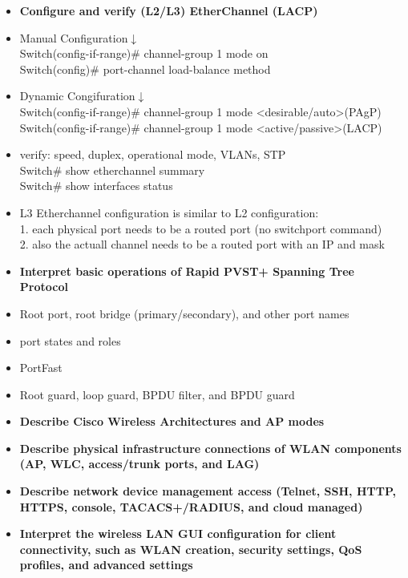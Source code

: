 \documentclass{article}
\begin{document}
\begin{itemize}
  \item \textbf{Configure and verify (L2/L3) EtherChannel (LACP)}
	\item[] Manual Configuration$\downarrow$\\
		Switch(config-if-range)\# channel-group 1 mode on\\
		Switch(config)\# port-channel load-balance method
	\item[] Dynamic Congifuration$\downarrow$\\
		Switch(config-if-range)\# channel-group 1 mode \textless desirable/auto\textgreater (PAgP)\\
		Switch(config-if-range)\# channel-group 1 mode \textless active/passive\textgreater (LACP)
	\item[] verify: speed, duplex, operational mode, VLANs, STP\\
		Switch\# show etherchannel summary\\
		Switch\# show interfaces status
	\item[] L3 Etherchannel configuration is similar to L2 configuration:\\
		1. each physical port needs to be a routed port (no switchport command)\\
		2. also the actuall channel needs to be a routed port with an IP and mask\\
  
  \item \textbf{Interpret basic operations of Rapid PVST+ Spanning Tree Protocol}
  	\item[] Root port, root bridge (primary/secondary), and other port names
  	\item[] port states and roles
  	\item[] PortFast
  	\item[] Root guard, loop guard, BPDU filter, and BPDU guard 
  
  \item \textbf{Describe Cisco Wireless Architectures and AP modes}
  
  \item \textbf{Describe physical infrastructure connections of WLAN components (AP, WLC, access/trunk ports, and LAG)}
  
  \item \textbf{Describe network device management access (Telnet, SSH, HTTP, HTTPS, console, TACACS+/RADIUS, and cloud managed)}
  
  \item \textbf{Interpret the wireless LAN GUI configuration for client connectivity, such as WLAN creation, security settings, QoS profiles, and advanced settings}\\
\end{itemize}
\end{document}
